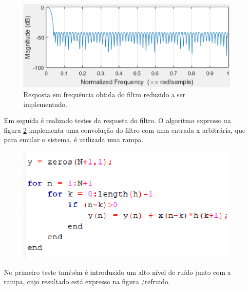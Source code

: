\begin{figure}[h]
	\centering
	\includegraphics[keepaspectratio=true,scale=0.9]{figuras/freqz}
	\caption{Resposta em frequência obtida do filtro reduzido a ser implementado.}
	\label{freqz}
\end{figure}

Em seguida é realizado testes da resposta do filtro. O algoritmo expresso na figura \ref{convolu} implementa uma convolução do filtro com uma entrada x arbitrária, que para emular o sistema, é utilizada uma rampa.

\begin{figure}[h]
	\centering
	\includegraphics[keepaspectratio=true,scale=0.9]{figuras/convolu}
	\caption{}
	\label{convolu}
\end{figure}

No primeiro teste também é introduzido um alto nível de ruído junto com a rampa, cujo resultado está expresso na figura /ref{ruido}.

